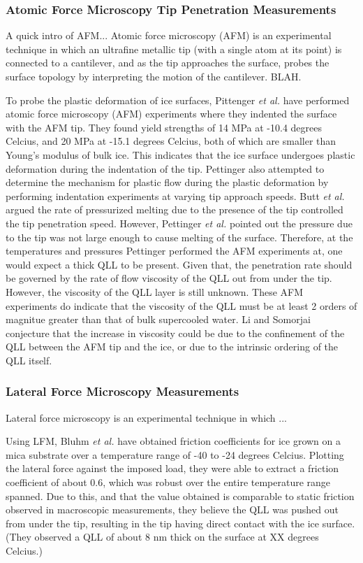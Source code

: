 \subsubsection{Atomic Force Microscopy Tip Penetration Measurements}
A quick intro of AFM...  Atomic force microscopy (AFM) is an
experimental technique in which an ultrafine metallic tip (with a
single atom at its point) is connected to a cantilever, and as the tip
approaches the surface, probes the surface topology by interpreting
the motion of the cantilever. BLAH. 

To probe the plastic deformation of ice surfaces, Pittenger \textit{et
  al.} have performed atomic force microscopy (AFM) experiments where
they indented the surface with the AFM tip.\cite{Butt00,
  Pittenger01,Bluhm00} They found yield strengths of 14 MPa at -10.4
degrees Celcius, and 20 MPa at -15.1 degrees Celcius, both of which
are smaller than Young's modulus of bulk ice. This indicates that the
ice surface undergoes plastic deformation during the indentation of
the tip. Pettinger also attempted to determine the mechanism for
plastic flow during the plastic deformation by performing indentation
experiments at varying tip approach speeds. Butt \textit{et al.}
argued the rate of pressurized melting due to the presence of the tip
controlled the tip penetration speed.\cite{Butt00} However, Pettinger
\textit{et al.} pointed out the pressure due to the tip was not large
enough to cause melting of the surface.\cite{Pittenger01} Therefore, at the
temperatures and pressures Pettinger performed the AFM experiments at,
one would expect a thick QLL to be present. Given that, the
penetration rate should be governed by the rate of flow viscosity of
the QLL out from under the tip. However, the viscosity of the QLL
layer is still unknown. These AFM experiments do indicate that the
viscosity of the QLL must be at least 2 orders of magnitue greater
than that of bulk supercooled water. Li and Somorjai conjecture that
the increase in viscosity could be due to the confinement of the QLL
between the AFM tip and the ice, or due to the intrinsic ordering of
the QLL itself.

\subsubsection{Lateral Force Microscopy Measurements}
Lateral force microscopy is an experimental technique in which ...

Using LFM, Bluhm \textit{et al.} have obtained friction coefficients
for ice grown on a mica substrate over a temperature range of -40 to
-24 degrees Celcius.\cite{Bluhm00} Plotting the lateral force against the
imposed load, they were able to extract a friction coefficient of
about 0.6, which was robust over the entire temperature range
spanned. Due to this, and that the value obtained is comparable to
static friction observed in macroscopic measurements, they believe the
QLL was pushed out from under the tip, resulting in the tip having
direct contact with the ice surface. (They observed a QLL of about 8 nm thick
on the surface at XX degrees Celcius.) 

